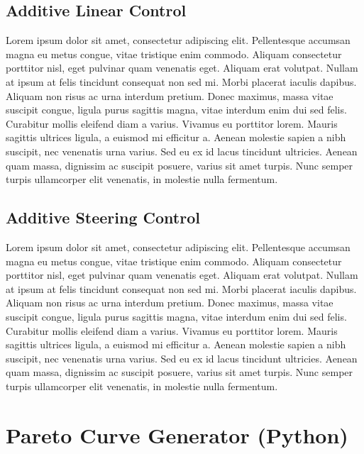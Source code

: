 \subsection{Additive Linear Control}
\label{sec:adas_lc}

Lorem ipsum dolor sit amet, consectetur adipiscing elit. Pellentesque accumsan magna eu metus congue, vitae tristique enim commodo. Aliquam consectetur porttitor nisl, eget pulvinar quam venenatis eget. Aliquam erat volutpat. Nullam at ipsum at felis tincidunt consequat non sed mi. Morbi placerat iaculis dapibus. Aliquam non risus ac urna interdum pretium. Donec maximus, massa vitae suscipit congue, ligula purus sagittis magna, vitae interdum enim dui sed felis. Curabitur mollis eleifend diam a varius. Vivamus eu porttitor lorem. Mauris sagittis ultrices ligula, a euismod mi efficitur a. Aenean molestie sapien a nibh suscipit, nec venenatis urna varius. Sed eu ex id lacus tincidunt ultricies. Aenean quam massa, dignissim ac suscipit posuere, varius sit amet turpis. Nunc semper turpis ullamcorper elit venenatis, in molestie nulla fermentum.

\subsection{Additive Steering Control}
\label{sec:adas_sc}

Lorem ipsum dolor sit amet, consectetur adipiscing elit. Pellentesque accumsan magna eu metus congue, vitae tristique enim commodo. Aliquam consectetur porttitor nisl, eget pulvinar quam venenatis eget. Aliquam erat volutpat. Nullam at ipsum at felis tincidunt consequat non sed mi. Morbi placerat iaculis dapibus. Aliquam non risus ac urna interdum pretium. Donec maximus, massa vitae suscipit congue, ligula purus sagittis magna, vitae interdum enim dui sed felis. Curabitur mollis eleifend diam a varius. Vivamus eu porttitor lorem. Mauris sagittis ultrices ligula, a euismod mi efficitur a. Aenean molestie sapien a nibh suscipit, nec venenatis urna varius. Sed eu ex id lacus tincidunt ultricies. Aenean quam massa, dignissim ac suscipit posuere, varius sit amet turpis. Nunc semper turpis ullamcorper elit venenatis, in molestie nulla fermentum.

\section{Pareto Curve Generator (Python)}


